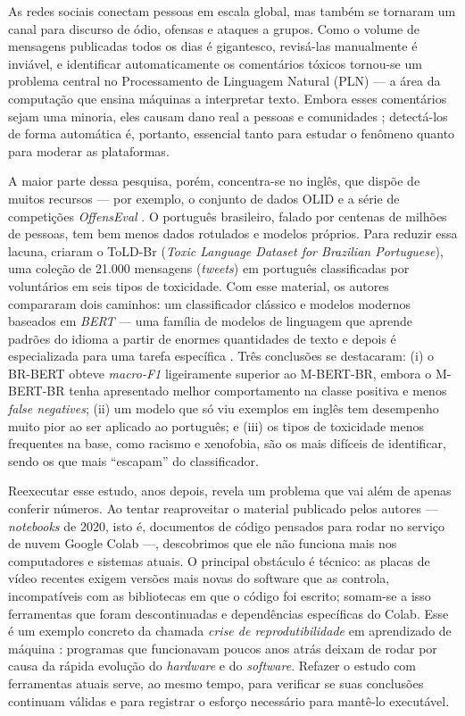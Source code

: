 \documentclass[sigconf, nonacm]{acmart}
\begin{document}
As redes sociais conectam pessoas em escala global, mas também se tornaram
um canal para discurso de ódio, ofensas e ataques a grupos. Como o volume
de mensagens publicadas todos os dias é gigantesco, revisá-las manualmente
é inviável, e identificar automaticamente os comentários tóxicos tornou-se
um problema central no Processamento de Linguagem Natural (PLN) --- a área
da computação que ensina máquinas a interpretar texto. Embora esses
comentários sejam uma minoria, eles causam dano real a pessoas e
comunidades \cite{leite2020toxic}; detectá-los de forma automática é,
portanto, essencial tanto para estudar o fenômeno quanto para moderar as
plataformas.
 
A maior parte dessa pesquisa, porém, concentra-se no inglês, que dispõe de
muitos recursos --- por exemplo, o conjunto de dados OLID
\cite{zampieri2019predicting} e a série de competições \emph{OffensEval}
\cite{zampieri2019predicting}. O português
brasileiro, falado por centenas de milhões de pessoas, tem bem menos dados
rotulados e modelos próprios. Para reduzir essa lacuna,
\citet{leite2020toxic} criaram o ToLD-Br (\emph{Toxic Language Dataset for
Brazilian Portuguese}), uma coleção de 21.000 mensagens (\emph{tweets}) em
português classificadas por voluntários em seis tipos de toxicidade. Com
esse material, os autores compararam dois caminhos: um classificador
clássico e modelos modernos baseados em \emph{BERT} --- uma família de
modelos de linguagem que aprende padrões do idioma a partir de enormes
quantidades de texto e depois é especializada para uma tarefa específica
\cite{devlin2019bert}. Três conclusões se destacaram: (i) o BR-BERT obteve \emph{macro-F1} ligeiramente
superior ao M-BERT-BR, embora o M-BERT-BR tenha apresentado melhor
comportamento na classe positiva e menos \emph{false negatives}; (ii) um modelo
que só viu exemplos em inglês tem desempenho muito pior ao ser aplicado ao
português; e (iii) os tipos de toxicidade menos frequentes na base, como
racismo e xenofobia, são os mais difíceis de identificar, sendo os que
mais ``escapam'' do classificador.
 
Reexecutar esse estudo, anos depois, revela um problema que vai além de
apenas conferir números. Ao tentar reaproveitar o material publicado pelos
autores --- \emph{notebooks} de 2020, isto é, documentos de código
pensados para rodar no serviço de nuvem Google Colab ---, descobrimos que
ele não funciona mais nos computadores e sistemas atuais. O principal
obstáculo é técnico: as placas de vídeo recentes exigem versões mais novas
do software que as controla, incompatíveis com as bibliotecas em que o
código foi escrito; somam-se a isso ferramentas que foram descontinuadas e
dependências específicas do Colab. Esse é um exemplo concreto da chamada
\emph{crise de reprodutibilidade} em aprendizado de máquina \cite{pineau2021improving}: programas que
funcionavam poucos anos atrás deixam de rodar por causa da rápida evolução
do \emph{hardware} e do \emph{software}. Refazer o estudo com ferramentas
atuais serve, ao mesmo tempo, para verificar se suas conclusões continuam
válidas e para registrar o esforço necessário para mantê-lo executável.
 
\end{document}
